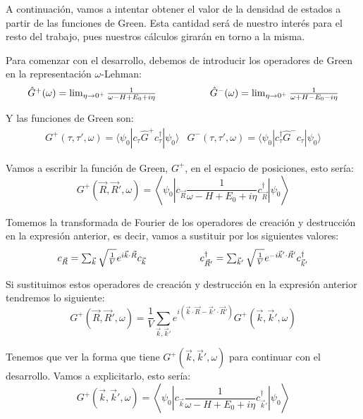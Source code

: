 \documentclass[12pt,twoside]{article}
\begin{document}
A continuación, vamos a intentar obtener el valor de la densidad de estados a partir de las funciones de Green. Esta cantidad será de nuestro interés para el resto del trabajo, pues nuestros cálculos girarán en torno a la misma.

Para comenzar con el desarrollo, debemos de introducir los operadores de Green en la representación $\omega$-Lehman:
\begin{equation}
  \begin{array}{ccc}
    \hat{G}^+(\omega) = \lim_{\eta\to 0^+}\frac{1}{\omega - H + E_0 + i\eta} & \hspace{0.1\linewidth} & \hat{G}^-(\omega) = \lim_{\eta\to 0^+}\frac{1}{\omega + H - E_0 - i\eta}
  \end{array}
\end{equation}

Y las funciones de Green son:
\begin{equation}
  \begin{array}{cc}
    G^+(\tau, \tau', \omega) = \langle\psi_0|c_{\tau}\hat{G}^+c_{\tau}^{\dagger}|\psi_0\rangle & G^-(\tau, \tau', \omega) = \langle\psi_0|c_{\tau}^{\dagger}\hat{G}^-c_{\tau}|\psi_0\rangle
  \end{array}
\end{equation}

Vamos a escribir la función de Green, $G^+$, en el espacio de posiciones, esto sería:
$$
G^+(\vec{R}, \vec{R}', \omega) = \left\langle\psi_0\left| c_{\vec{R}}\frac{1}{\omega - H + E_0 + i\eta}c_{\vec{R}}^{\dagger}\right|\psi_0\right\rangle
$$

Tomemos la transformada de Fourier de los operadores de creación y destrucción en la expresión anterior, es decir, vamos a sustituir por los siguientes valores:
$$
\begin{array}{ccc}
  c_{\vec{R}} = \sum_{\vec{k}}\sqrt{\frac{1}{V}}e^{i\vec{k}\cdot\vec{R}}c_{\vec{k}} & \hspace{0.1\linewidth} & c_{\vec{R}'}^{\dagger} = \sum_{\vec{k}'}\sqrt{\frac{1}{V}}e^{-i\vec{k}'\cdot\vec{R}'}c_{\vec{k}'}^{\dagger}
\end{array}
$$

Si sustituimos estos operadores de creación y destrucción en la expresión anterior tendremos lo siguiente:
$$
G^+(\vec{R}, \vec{R}', \omega) = \frac{1}{V}\sum_{\vec{k}, \vec{k}'}e^{i\left(\vec{k}\cdot\vec{R} - \vec{k}'\cdot\vec{R}'\right)}G^+(\vec{k}, \vec{k}', \omega)
$$

Tenemos que ver la forma que tiene $G^+(\vec{k}, \vec{k}', \omega)$ para continuar con el desarrollo. Vamos a explicitarlo, esto sería:
$$
G^+(\vec{k}, \vec{k}', \omega) = \left\langle\psi_0\left| c_{\vec{k}}\frac{1}{\omega - H + E_0 + i\eta}c_{\vec{k}'}^{\dagger}\right|\psi_0\right\rangle
$$
\end{document}

